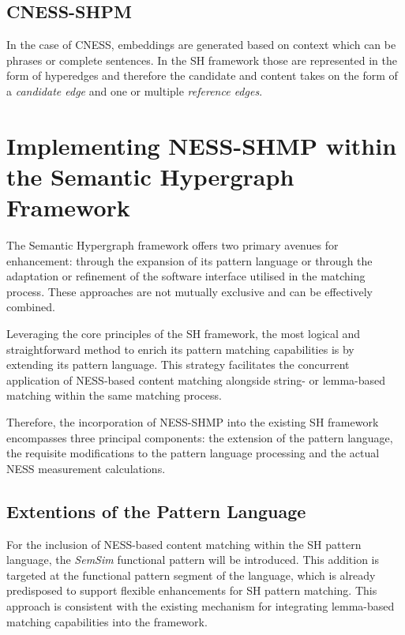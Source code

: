 \documentclass[11pt]{scrreprt}
\begin{document}
\subsection{CNESS-SHPM}
In the case of CNESS, embeddings are generated based on context which can be phrases or complete sentences. In the SH framework those are represented in the form of hyperedges and therefore the candidate and content takes on the form of a \textit{candidate edge} and one or multiple \textit{reference edges}. 

\section{Implementing NESS-SHMP within the Semantic Hypergraph Framework}

The Semantic Hypergraph framework offers two primary avenues for enhancement: through the expansion of its pattern language or through the adaptation or refinement of the software interface utilised in the matching process. These approaches are not mutually exclusive and can be effectively combined.

Leveraging the core principles of the SH framework, the most logical and straightforward method to enrich its pattern matching capabilities is by extending its pattern language. This strategy facilitates the concurrent application of NESS-based content matching alongside string- or lemma-based matching within the same matching process.

Therefore, the incorporation of NESS-SHMP into the existing SH framework encompasses three principal components: the extension of the pattern language, the requisite modifications to the pattern language processing and the actual NESS measurement calculations.



\subsection{Extentions of the Pattern Language}
For the inclusion of NESS-based content matching within the SH pattern language, the \textit{SemSim} functional pattern will be introduced. This addition is targeted at the functional pattern segment of the language, which is already predisposed to support flexible enhancements for SH pattern matching. This approach is consistent with the existing mechanism for integrating lemma-based matching capabilities into the framework.
\end{document}
